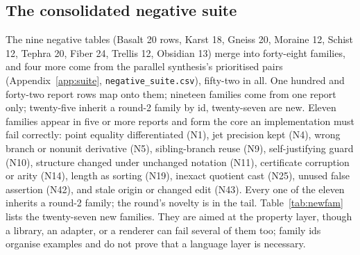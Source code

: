 \documentclass[11pt,a4paper]{article}
\newcommand{\code}[1]{\nolinkurl{#1}}
\theoremstyle{definition}
\begin{document}
\subsection{The consolidated negative suite}\label{sec:suite}
The nine negative tables (Basalt 20 rows, Karst 18, Gneiss 20, Moraine 12, Schist 12, Tephra 20, Fiber 24, Trellis 12, Obsidian 13) merge into forty-eight families, and four more come from the parallel synthesis's prioritised pairs (Appendix~\ref{app:suite}, \code{negative_suite.csv}), fifty-two in all. One hundred and forty-two report rows map onto them; nineteen families come from one report only; twenty-five inherit a round-2 family by id, twenty-seven are new. Eleven families appear in five or more reports and form the core an implementation must fail correctly: point equality differentiated (N1), jet precision kept (N4), wrong branch or nonunit derivative (N5), sibling-branch reuse (N9), self-justifying guard (N10), structure changed under unchanged notation (N11), certificate corruption or arity (N14), length as sorting (N19), inexact quotient cast (N25), unused false assertion (N42), and stale origin or changed edit (N43). Every one of the eleven inherits a round-2 family; the round's novelty is in the tail. Table~\ref{tab:newfam} lists the twenty-seven new families. They are aimed at the property layer, though a library, an adapter, or a renderer can fail several of them too; family ids organise examples and do not prove that a language layer is necessary.
\end{document}
